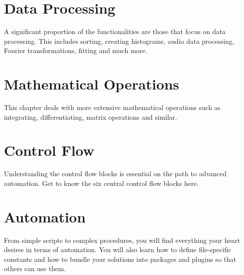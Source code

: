 \documentclass[DIV=17, parskip=half]{scrreprt}
\begin{document}
	\chapter{Data Processing}
		A significant proportion of the functionalities are those that focus on data processing. This includes sorting, creating histograms, audio data processing, Fourier transformations, fitting and much more.
		
		
		
		
		
		
		
		
		
		
		
		
		
		
		
		
		
		
		
		
		
		
	
	\chapter{Mathematical Operations}
		This chapter deals with more extensive mathematical operations such as integrating, differentiating, matrix operations and similar.
		
		
		
		
		
		
		
		
		
	\chapter{Control Flow}
		Understanding the control flow blocks is essential on the path to advanced automation. Get to know the six central control flow blocks here.
		
		
		
		
		
		
		
	
	\chapter{Automation}
		From simple scripts to complex procedures, you will find everything your heart desires in terms of automation. You will also learn how to define file-specific constants and how to bundle your solutions into packages and plugins so that others can use them.
		
		
		
		
		
		
		
		
		
		
	
\end{document}
